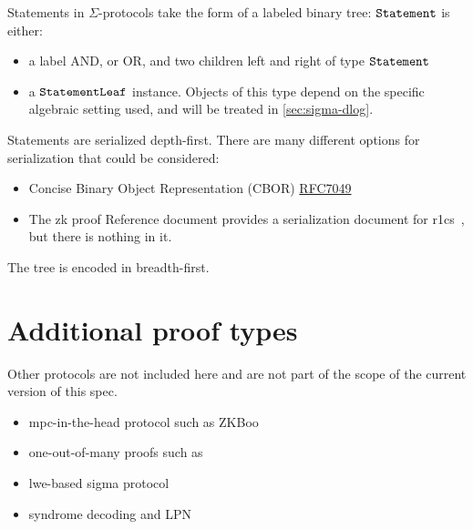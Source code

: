 \documentclass[11pt]{article}
\begin{document}
Statements in $\Sigma$-protocols take the form of a labeled binary tree:
$\texttt{Statement}$ is either:
\begin{itemize}
  \item a label \textsf{AND}, or \textsf{OR}, and two children \textsf{left} and \textsf{right} of type $\texttt{Statement}$
  \item a $\texttt{StatementLeaf}$ instance. Objects of this type depend on the specific algebraic setting used, and will be treated in \cref{sec:sigma-dlog}.
\end{itemize}
Statements are serialized depth-first.
  There are many different options for serialization that could be considered:
  \begin{itemize}
  \item Concise Binary Object Representation (CBOR) \href{https://datatracker.ietf.org/doc/html/rfc7049}{RFC7049}
    \item The zk proof Reference document provides a serialization document for r1cs~\cite[3.4.2]{zkproof-reference}, but there is nothing in it.
\end{itemize}
The tree is encoded in breadth-first.



\section{Additional proof types}

Other protocols are not included here and are not part of the scope of the current version of this spec.
\begin{itemize}
\item mpc-in-the-head protocol such as ZKBoo~\cite{USENIX:GiaMadOrl16}
\item one-out-of-many proofs such as~\cite{EC:GroKoh15}
\item lwe-based sigma protocol~\cite{C:AttCraKoh21}
\item syndrome decoding and LPN~\cite{C:Stern93,AC:JKPT12}
\end{itemize}



\end{document}

